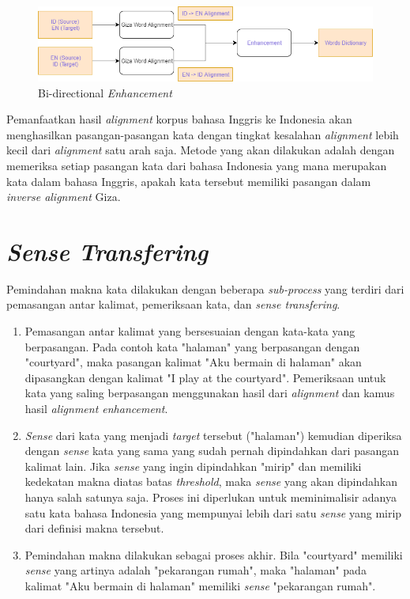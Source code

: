 \begin{figure}
	\centering
	\includegraphics[width=1\linewidth]{adit_pics/bidirectional-enhancement.png}
	\caption{Bi-directional \textit{Enhancement}}
	\label{fig:Bidirectional-Enhancement}
\end{figure}


Pemanfaatkan hasil \textit{alignment} korpus bahasa Inggris ke Indonesia akan menghasilkan pasangan-pasangan kata dengan tingkat kesalahan \textit{alignment} lebih kecil dari \textit{alignment} satu arah saja. Metode yang akan dilakukan adalah dengan memeriksa setiap pasangan kata dari bahasa Indonesia yang mana merupakan kata dalam bahasa Inggris, apakah kata tersebut memiliki pasangan dalam \textit{inverse alignment} Giza.




\section{\textit{Sense Transfering}} \label{sec:Sense Transfering}
Pemindahan makna kata dilakukan dengan beberapa \textit{sub-process} yang terdiri dari pemasangan antar kalimat, pemeriksaan kata, dan \textit{sense transfering}.
\begin{enumerate}
	\item Pemasangan antar kalimat yang bersesuaian dengan kata-kata yang berpasangan. Pada contoh kata "halaman" yang berpasangan dengan "courtyard", maka pasangan kalimat "Aku bermain di halaman" akan dipasangkan dengan kalimat "I play at the courtyard". Pemeriksaan untuk kata yang saling berpasangan menggunakan hasil dari \textit{alignment} dan kamus hasil \textit{alignment enhancement}.
	\item \textit{Sense} dari kata yang menjadi \textit{target} tersebut ("halaman") kemudian diperiksa dengan \textit{sense} kata yang sama yang sudah pernah dipindahkan dari pasangan kalimat lain. Jika \textit{sense} yang ingin dipindahkan "mirip" dan memiliki kedekatan makna diatas batas \textit{threshold}, maka \textit{sense} yang akan dipindahkan hanya salah satunya saja. Proses ini diperlukan untuk meminimalisir adanya satu kata bahasa Indonesia yang mempunyai lebih dari satu \textit{sense} yang mirip dari definisi makna tersebut.
	\item Pemindahan makna dilakukan sebagai proses akhir. Bila "courtyard" memiliki \textit{sense} yang artinya adalah "pekarangan rumah", maka "halaman" pada kalimat "Aku bermain di halaman" memiliki \textit{sense} "pekarangan rumah".
\end{enumerate}

